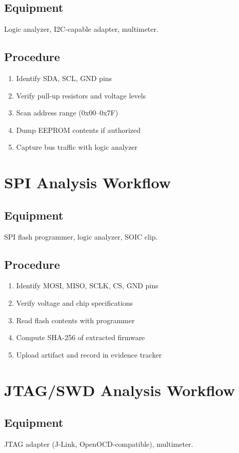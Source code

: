 \documentclass[11pt,a4paper]{article}
\begin{document}
\subsection{Equipment}
Logic analyzer, I2C-capable adapter, multimeter.
\subsection{Procedure}
\begin{enumerate}
  \item Identify SDA, SCL, GND pins
  \item Verify pull-up resistors and voltage levels
  \item Scan address range (0x00--0x7F)
  \item Dump EEPROM contents if authorized
  \item Capture bus traffic with logic analyzer
\end{enumerate}

\section{SPI Analysis Workflow}
\subsection{Equipment}
SPI flash programmer, logic analyzer, SOIC clip.
\subsection{Procedure}
\begin{enumerate}
  \item Identify MOSI, MISO, SCLK, CS, GND pins
  \item Verify voltage and chip specifications
  \item Read flash contents with programmer
  \item Compute SHA-256 of extracted firmware
  \item Upload artifact and record in evidence tracker
\end{enumerate}

\section{JTAG/SWD Analysis Workflow}
\subsection{Equipment}
JTAG adapter (J-Link, OpenOCD-compatible), multimeter.
\end{document}
